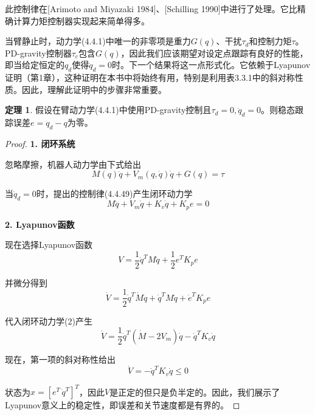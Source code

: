 \documentclass[UTF8]{ctexart}
\theoremstyle{definition}
\newtheorem{theorem}{定理}[section]
\begin{document}
此控制律在[Arimoto and Miyazaki 1984]、[Schilling 1990]中进行了处理。它比精确计算力矩控制器实现起来简单得多。

当臂静止时，动力学(4.4.1)中唯一的非零项是重力$G(q)$、干扰$\tau_d$和控制力矩$\tau$。PD-gravity控制器$\tau_c$包含$G(q)$，因此我们应该期望对设定点跟踪有良好的性能，即当给定恒定的$q_d$使得$\ddot{q}_d = 0$时。下一个结果将这一点形式化。它依赖于Lyapunov证明（第1章），这种证明在本书中将始终有用，特别是利用表3.3.1中的斜对称性质。因此，理解此证明中的步骤非常重要。

\begin{theorem}
假设在臂动力学(4.4.1)中使用PD-gravity控制且$\tau_d = 0, \ddot{q}_d = 0$。则稳态跟踪误差$e = q_d - q$为零。
\end{theorem}

\begin{proof}
\textbf{1. 闭环系统}

忽略摩擦，机器人动力学由下式给出
\begin{equation}
    M(q)\ddot{q} + V_m(q, \dot{q})\dot{q} + G(q) = \tau
\end{equation}

当$\ddot{q}_d = 0$时，提出的控制律(4.4.49)产生闭环动力学
\begin{equation}
    M\ddot{q} + V_m\dot{q} + K_v\dot{q} + K_pe = 0
\end{equation}

\textbf{2. Lyapunov函数}

现在选择Lyapunov函数
\begin{equation}
    V = \frac{1}{2}\dot{q}^TM\dot{q} + \frac{1}{2}e^TK_pe
\end{equation}

并微分得到
\begin{equation}
    \dot{V} = \frac{1}{2}\dot{q}^T\dot{M}\dot{q} + \dot{q}^TM\ddot{q} + \dot{e}^TK_pe
\end{equation}

代入闭环动力学(2)产生
\begin{equation}
    \dot{V} = \frac{1}{2}\dot{q}^T(\dot{M} - 2V_m)\dot{q} - \dot{q}^TK_v\dot{q}
\end{equation}

现在，第一项的斜对称性给出
\begin{equation}
    \dot{V} = -\dot{q}^TK_v\dot{q} \leq 0
\end{equation}

状态为$x = [e^T \, \dot{q}^T]^T$，因此$V$是正定的但只是负半定的。因此，我们展示了Lyapunov意义上的稳定性，即误差和关节速度都是有界的。


\end{proof}
\end{document}
